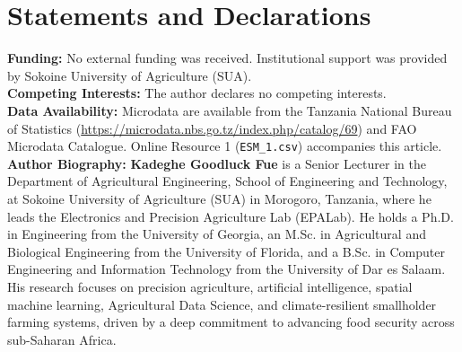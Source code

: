 \documentclass[10pt,a4paper]{article}
\begin{document}
\section*{Statements and Declarations}
\textbf{Funding:} No external funding was received. Institutional support was provided by Sokoine University of Agriculture (SUA).\\
\textbf{Competing Interests:} The author declares no competing interests.\\
\textbf{Data Availability:} Microdata are available from the Tanzania National Bureau of Statistics (\url{https://microdata.nbs.go.tz/index.php/catalog/69}) and FAO Microdata Catalogue. Online Resource 1 (\texttt{ESM\_1.csv}) accompanies this article.\\
\textbf{Author Biography:} \textbf{Kadeghe Goodluck Fue} is a Senior Lecturer in the Department of Agricultural Engineering, School of Engineering and Technology, at Sokoine University of Agriculture (SUA) in Morogoro, Tanzania, where he leads the Electronics and Precision Agriculture Lab (EPALab). He holds a Ph.D. in Engineering from the University of Georgia, an M.Sc. in Agricultural and Biological Engineering from the University of Florida, and a B.Sc. in Computer Engineering and Information Technology from the University of Dar es Salaam. His research focuses on precision agriculture, artificial intelligence, spatial machine learning, Agricultural Data Science, and climate-resilient smallholder farming systems, driven by a deep commitment to advancing food security across sub-Saharan Africa.
\end{document}
